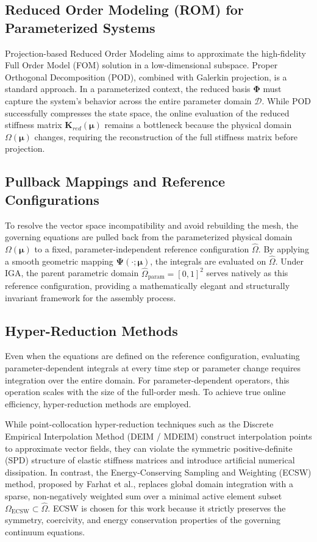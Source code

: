 \subsection{Reduced Order Modeling (ROM) for Parameterized Systems}
Projection-based Reduced Order Modeling aims to approximate the high-fidelity Full Order Model (FOM) solution in a low-dimensional subspace. Proper Orthogonal Decomposition (POD), combined with Galerkin projection, is a standard approach.
In a parameterized context, the reduced basis $\boldsymbol{\Phi}$ must capture the system's behavior across the entire parameter domain $\mathcal{D}$. While POD successfully compresses the state space, the online evaluation of the reduced stiffness matrix $\mathbf{K}_{red}(\boldsymbol{\mu})$ remains a bottleneck because the physical domain $\Omega(\boldsymbol{\mu})$ changes, requiring the reconstruction of the full stiffness matrix before projection.

\subsection{Pullback Mappings and Reference Configurations}
To resolve the vector space incompatibility and avoid rebuilding the mesh, the governing equations are pulled back from the parameterized physical domain $\Omega(\boldsymbol{\mu})$ to a fixed, parameter-independent reference configuration $\hat{\Omega}$. By applying a smooth geometric mapping $\boldsymbol{\Psi}(\cdot; \boldsymbol{\mu})$, the integrals are evaluated on $\hat{\Omega}$. Under IGA, the parent parametric domain $\hat{\Omega}_{\text{param}} = [0, 1]^2$ serves natively as this reference configuration, providing a mathematically elegant and structurally invariant framework for the assembly process.

\subsection{Hyper-Reduction Methods}
Even when the equations are defined on the reference configuration, evaluating parameter-dependent integrals at every time step or parameter change requires integration over the entire domain. For parameter-dependent operators, this operation scales with the size of the full-order mesh. To achieve true online efficiency, hyper-reduction methods are employed. 

While point-collocation hyper-reduction techniques such as the Discrete Empirical Interpolation Method (DEIM / MDEIM) \cite{Chaturantabut2010, Bonomi2017} construct interpolation points to approximate vector fields, they can violate the symmetric positive-definite (SPD) structure of elastic stiffness matrices and introduce artificial numerical dissipation. In contrast, the Energy-Conserving Sampling and Weighting (ECSW) method, proposed by Farhat et al., replaces global domain integration with a sparse, non-negatively weighted sum over a minimal active element subset $\Omega_{\text{ECSW}} \subset \hat{\Omega}$. ECSW is chosen for this work because it strictly preserves the symmetry, coercivity, and energy conservation properties of the governing continuum equations.

